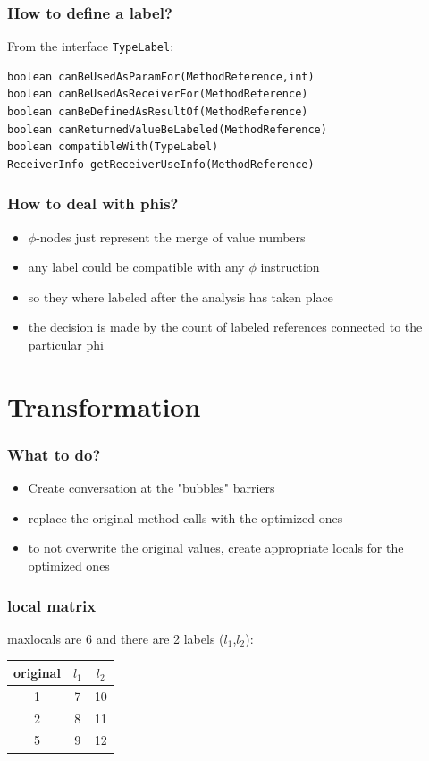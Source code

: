 \documentclass{beamer}
\begin{document}
\begin{frame}[fragile]
  \frametitle{How to define a label?}
  From the interface \texttt{TypeLabel}:
  \begin{lstlisting}
boolean canBeUsedAsParamFor(MethodReference,int)
boolean canBeUsedAsReceiverFor(MethodReference)
boolean canBeDefinedAsResultOf(MethodReference)
boolean canReturnedValueBeLabeled(MethodReference)
boolean compatibleWith(TypeLabel)
ReceiverInfo getReceiverUseInfo(MethodReference)
  \end{lstlisting}
\end{frame}

\begin{frame}
  \frametitle{How to deal with phis?}
  \begin{itemize}
    \item $\phi$-nodes just represent the merge of value numbers  
    \item any label could be compatible with any $\phi$ instruction
    \item so they where labeled after the analysis has taken place
    \item the decision is made by the count of labeled references connected to the particular phi
  \end{itemize}
\end{frame}

\section{Transformation}

\frame{\sectionpage}

\begin{frame}
	\frametitle{What to do?}
	\begin{itemize}
    \item Create conversation at the "bubbles" barriers
    \item replace the original method calls with the optimized ones
    \item to not overwrite the original values, create appropriate locals for the optimized ones
	\end{itemize}
\end{frame}

\begin{frame}
  \frametitle{local matrix}
  
  maxlocals are 6 and there are 2 labels ($l_1$,$l_2$):
  
  \begin{center}
    \begin{tabular}{c || c | c}
      original & $l_1$ & $l_2$ \\
      \hline 
      1 & 7 & 10 \\
      \hline
      2 & 8 & 11 \\
      \hline
      5 & 9 & 12 \\
    \end{tabular}
  \end{center}    
\end{frame}
\end{document}
